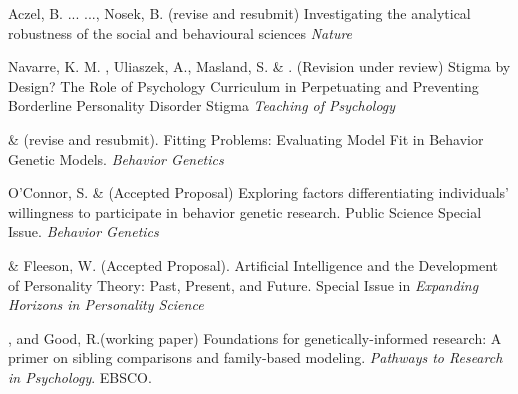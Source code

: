\item Aczel, B. ... \meb..., Nosek, B. (revise and resubmit) Investigating the analytical robustness of the social and behavioural sciences \textit{Nature}

\item Navarre, K. M. \noteB, Uliaszek, A., Masland, S. \& \meb. (Revision under review) Stigma by Design? The Role of Psychology Curriculum in Perpetuating and Preventing Borderline Personality Disorder Stigma \textit{Teaching of Psychology}



\item \meb \& \joe (revise and resubmit). Fitting Problems: Evaluating Model Fit in Behavior Genetic Models. \textit{Behavior Genetics}  \href{https://doi.org/10.31234/osf.io/qys83}{\small\color{blue}{10.31234/osf.io/qys83}}


\item O'Connor, S. \& \meb (Accepted Proposal) Exploring factors differentiating individuals’ willingness to participate in behavior genetic research. Public Science Special Issue. \textit{Behavior Genetics}

\item \meb \& Fleeson, W. (Accepted Proposal). Artificial Intelligence and the Development of Personality Theory: Past, Present, and Future. Special Issue in \textit{Expanding Horizons in Personality Science}


\item \meb, and Good, R.\noteA (working paper) Foundations for genetically-informed research: A primer on sibling comparisons and family-based modeling. \textit{Pathways to Research in Psychology}. EBSCO.

%





